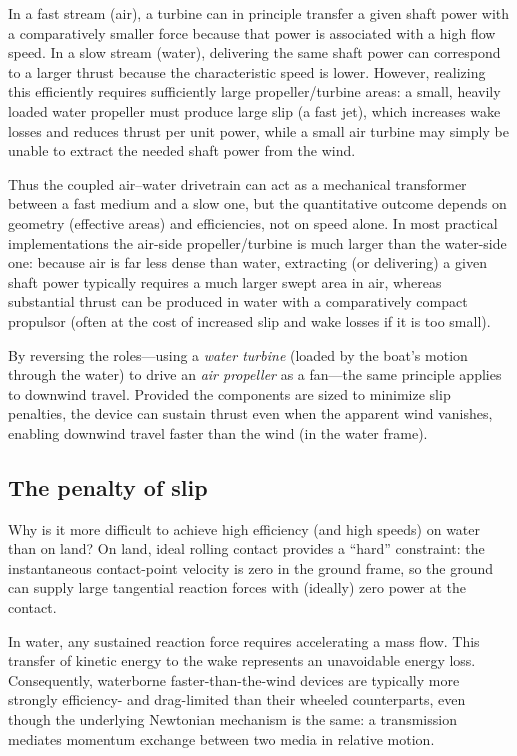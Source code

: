 \documentclass[a4paper]{article}
\begin{document}
In a fast stream (air), a turbine can in principle transfer a given shaft power
with a comparatively smaller force because that power is associated with a high
flow speed.  In a slow stream (water), delivering the same shaft power can
correspond to a larger thrust because the characteristic speed is lower.
However, realizing this efficiently requires sufficiently large propeller/turbine
areas: a small, heavily loaded water propeller must produce large slip (a fast
jet), which increases wake losses and reduces thrust per unit power, while a
small air turbine may simply be unable to extract the needed shaft power from
the wind.

Thus the coupled air--water drivetrain can act as a mechanical transformer
between a fast medium and a slow one, but the quantitative outcome depends on
geometry (effective areas) and efficiencies, not on speed alone.  In most
practical implementations the air-side propeller/turbine is much larger than
the water-side one: because air is far less dense than water, extracting (or
delivering) a given shaft power typically requires a much larger swept area in
air, whereas substantial thrust can be produced in water with a comparatively
compact propulsor (often at the cost of increased slip and wake losses if it is
too small).

By reversing the roles---using a \emph{water turbine} (loaded by the boat's
motion through the water) to drive an \emph{air propeller} as a fan---the same
principle applies to downwind travel. Provided the components are sized to
minimize slip penalties, the device can sustain thrust even when the apparent
wind vanishes, enabling downwind travel faster than the wind (in the water
frame).

\subsection{The penalty of slip}

Why is it more difficult to achieve high efficiency (and high speeds) on water than on land?
On land, ideal rolling contact provides a ``hard'' constraint: the instantaneous
contact-point velocity is zero in the ground frame, so the ground can supply
large tangential reaction forces with (ideally) zero power at the contact.

In water, any sustained reaction force requires accelerating a mass flow. This
transfer of kinetic energy to the wake represents an unavoidable energy loss.
Consequently, waterborne faster-than-the-wind devices are
typically more strongly efficiency- and drag-limited than their wheeled
counterparts, even though the underlying Newtonian mechanism is the same: a
transmission mediates momentum exchange between two media in relative motion.
\end{document}
